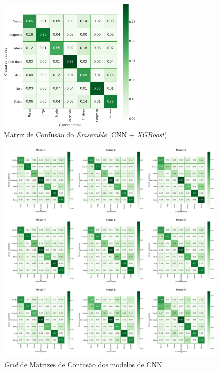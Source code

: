 \begin{figure}[!htb]
    \centering
    \includegraphics[width=7cm]{images/cm_emsemble.png}
    \caption{Matriz de Confusão do \emph{Emsemble} (CNN + \emph{XGBoost})}
    \label{fig:emsemble}
\end{figure}

\begin{figure}[!htb]
    \centering
    \includegraphics[width=17cm]{images/cm_grid.png}
    \caption{\emph{Grid} de Matrizes de Confusão dos modelos de CNN}
    \label{fig:grid}
\end{figure}